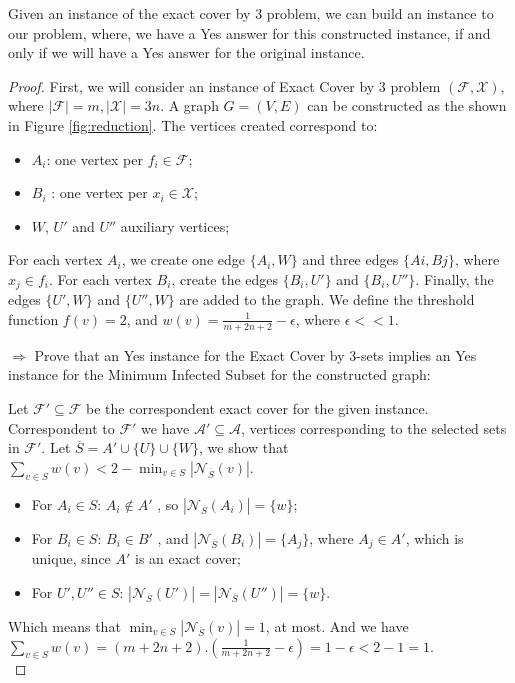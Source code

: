 \begin{mytheo}
Given an instance of the exact cover by 3 problem, we can build an instance to our problem, where, we have a Yes answer for this constructed instance, if and only if we will have a Yes answer for the original instance.  
\end{mytheo}
\begin{proof}
First, we will consider an instance of Exact Cover by 3 problem $(\mathcal{F}, \mathcal{X})$, where $|\mathcal{F}| = m, |\mathcal{X}| = 3n$. A graph $G = (V, E)$ can be constructed as the shown in Figure \ref{fig:reduction}. The vertices created correspond to: 
\begin{itemize}
\item $A_i$: one vertex per $f_i \in \mathcal{F}$;
\item $B_i$ : one vertex per $x_i \in \mathcal{X}$; 
\item $W$, $U'$ and $U''$ auxiliary vertices;  
\end{itemize}
For each vertex $A_i$, we create one edge $\{A_i, W\}$ and three edges $\{Ai, Bj\}$, where $x_j \in f_i$. For each vertex $B_i$, create the edges $\{B_i, U'\}$  and $\{B_i, U''\}$. Finally, the edges $\{U', W\}$ and $\{U'', W\}$ are added to the graph. We define the threshold function $f(v) = 2$, and $w(v) = \frac{1}{m + 2n + 2} -  \epsilon $, where $\epsilon < < 1$. 

$\Rightarrow$ Prove that an Yes instance for the Exact Cover by 3-sets implies an Yes instance for the  Minimum Infected Subset for the constructed graph:

Let $\mathcal{F}' \subseteq \mathcal{F}$ be the correspondent exact cover for the given instance. Correspondent to $\mathcal{F}'$ we have $\mathcal{A}'  \subseteq \mathcal{A}$, vertices corresponding to the selected sets in $\mathcal{F}'$. Let $\overline{S} = A' \cup \{U\} \cup \{W\}$, we show that $ \displaystyle\sum\limits_{v \in S} w(v)   <  2 -  \min_{v \in S} |\mathcal{N}_{\overline{S}}(v)| $. 
\begin{itemize}
\item For $A_i \in S$: $A_i \notin A'$ , so $|\mathcal{N}_{\overline{S}}(A_i)| = \{w\}$;
\item For $B_i \in S$: $B_i \in B'$ , and  $|\mathcal{N}_{\overline{S}}(B_i)| = \{A_j\}$, where $A_j \in A'$, which is unique, since $A'$ is an exact cover;
\item For $U', U'' \in S$: $|\mathcal{N}_{\overline{S}}(U')| =  |\mathcal{N}_{\overline{S}}(U'')| = \{w\}$.
\end{itemize}
Which means that $\min_{v \in S} |\mathcal{N}_{\overline{S}}(v)|  = 1$, at most. And we have $ \displaystyle\sum\limits_{v \in S} w(v) = (m + 2n +2) . (\frac{1}{m + 2n + 2} - \epsilon)  = 1 - \epsilon < 2 - 1 = 1$. \\


\end{proof}
